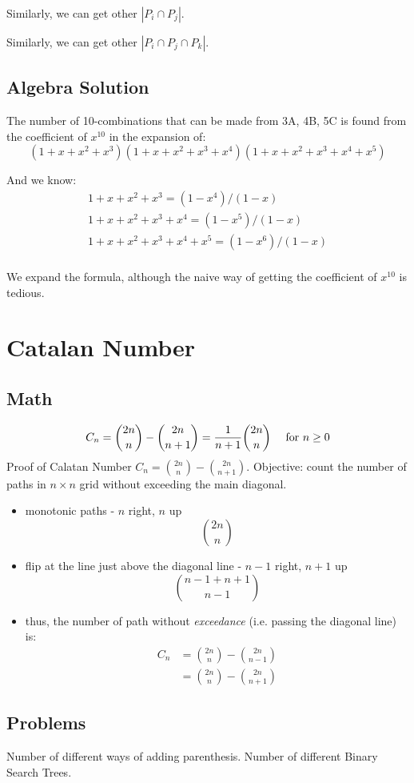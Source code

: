 Similarly, we can get other $|P_i \cap P_j|$.

Similarly, we can get other $|P_i \cap P_j \cap P_k|$.
\subsection{Algebra Solution}
The number of 10-combinations that can be made from 3A, 4B, 5C is found from the coefficient of $x^{10}$ in the expansion of:
$$
(1+x+x^2+x^3)(1+x+x^2+x^3+x^4)(1+x+x^2+x^3+x^4+x^5)
$$

And we know:
\begin{eqnarray*}
1+x+x^2+x^3         = (1-x^4)/(1-x)  \\
1+x+x^2+x^3+x^4     = (1-x^5)/(1-x)  \\
1+x+x^2+x^3+x^4+x^5 = (1-x^6)/(1-x)  \\
\end{eqnarray*}


We expand the formula, although the  naive way of getting the coefficient of $x^{10}$ is tedious. 

\section{Catalan Number}
\subsection{Math}
$$
C_n = {2n\choose n} - {2n\choose n+1} = {1\over n+1}{2n\choose n} \quad\text{ for }n\ge 0
$$
 Proof of Calatan Number $C_n ={2n\choose n} - {2n\choose n+1}$. Objective: count the number of paths in $n\times n$ grid without exceeding the main diagonal. 
\begin{itemize}
\begin{figure}[]
    \centerline{\texttt{[image: catalan\_proof]}}
    \caption{Monotonic Paths}
  \label{fig:catalanProof}
\end{figure}
\item monotonic paths - $n$ right, $n$ up
$$
{2n\choose n}
$$
\item flip at the line just above the diagonal line - $n-1$ right, $n+1$ up
$$
{n-1+n+1\choose n-1}
$$
\item thus, the number of path without \textit{exceedance} (i.e. passing the diagonal line) is: 
\begin{align*}
C_n &= {2n\choose n} - {2n\choose n-1}\\ 
&={2n\choose n} - {2n\choose n+1}
\end{align*}
\end{itemize}

\subsection{Problems}
Number of different ways of adding parenthesis. 
Number of different Binary Search Trees.

